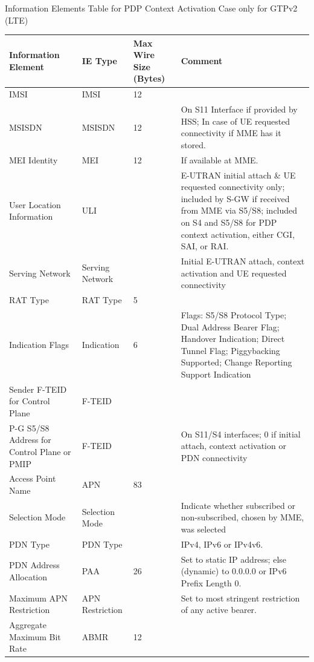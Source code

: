 \begin{itemize}
Information Elements Table for PDP Context Activation Case only for GTPv2 (LTE)
\begin{longtabu} to\linewidth{| X[2,l] | X[2,c] | X[l] | X[4] |}
\hline
Information Element 						& IE Type 					& Max Wire Size (Bytes)	& Comment \\ \hline
\gls{IMSI} 										& IMSI 						& 12					& \\ \hline
\gls{MSISDN} 										& MSISDN					& 12					& On S11 Interface if provided by HSS; In case of UE requested connectivity if MME has it stored. \\ \hline
MEI Identity 								& MEI 						& 12					& If available at MME. \\ \hline
User Location Information 					& ULI						& 						& E-UTRAN initial attach \&  UE requested connectivity only; included by S-GW if received from MME via S5/S8; included on S4 and S5/S8 for PDP context activation, either CGI, SAI, or RAI. \\ \hline
Serving Network								& Serving Network			& 						& Initial E-UTRAN attach, context activation and UE requested connectivity \\ \hline
\gls{RAT} Type									& RAT Type					& 5						& \\ \hline
Indication Flags							& Indication				& 6						& Flags: S5/S8 Protocol Type; Dual Address Bearer Flag; Handover Indication; Direct Tunnel Flag; Piggybacking Supported; Change Reporting Support Indication \\ \hline
Sender F-TEID for Control Plane				& F-TEID					& 						& \\ \hline
P-G S5/S8 Address for Control Plane or PMIP	& F-TEID					& 						& On S11/S4 interfaces; 0 if initial attach, context activation or PDN connectivity \\ \hline
Access Point Name							& APN						& 83					& \\ \hline
Selection Mode								& Selection Mode			& 						& Indicate whether subscribed or non-subscribed, chosen by MME, was selected \\ \hline
PDN Type									& PDN Type					& 						& IPv4, IPv6 or IPv4v6. \\ \hline
PDN Address Allocation						& PAA						& 26					& Set to static IP address; else (dynamic) to 0.0.0.0 or IPv6 Prefix Length 0. \\ \hline
Maximum APN Restriction						& APN Restriction			& 						& Set to most stringent restriction of any active bearer. \\ \hline
Aggregate Maximum Bit Rate					& ABMR						& 12					& \\ \hline

\end{longtabu}
\end{itemize}
